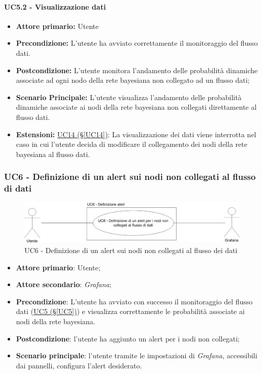\paragraph{UC5.2 - Visualizzazione dati}\label{UC5.2}
\begin{itemize}
\item \textbf{Attore primario:} Utente
\item \textbf{Precondizione:} L'utente ha avviato correttamente il monitoraggio del flusso dati.
\item \textbf{Postcondizione:} L'utente monitora l'andamento delle probabilità dinamiche associate ad ogni nodo della rete bayesiana non collegato ad un flusso dati;
\item \textbf{Scenario Principale:} L'utente visualizza l'andamento delle probabilità dinamiche associate ai nodi 			della rete bayesiana non collegati direttamente al flusso dati.
\item \textbf{Estensioni:} \hyperref[UC14]{UC14 (§\ref*{UC14})}: La visualizzazione dei dati viene interrotta nel 			caso in cui l'utente decida di modificare il collegamento dei nodi della rete bayesiana al flusso dati.
\end{itemize}

\newpage

\subsubsection{UC6 - Definizione di un alert sui nodi non collegati al flusso di dati}\label{UC6}

\begin{figure}[H]
	\centering
	\includegraphics[scale=0.3]{./images/UC6.png}
	\caption{UC6 - Definizione di un alert sui nodi non collegati al flusso dei dati}
\end{figure}

\begin{itemize}
	\item \textbf{Attore primario}: Utente;
	\item \textbf{Attore secondario}: \textit{Grafana};
	\item \textbf{Precondizione}: L'utente ha avviato con successo il monitoraggio del flusso dati (\hyperref[UC5]					{UC5 (§\ref*{UC5})}) e visualizza correttamente le probabilità associate ai nodi della rete bayesiana.
	\item \textbf{Postcondizione}: l'utente ha aggiunto un alert per i nodi non collegati;
	\item \textbf{Scenario principale}: l'utente tramite le impostazioni di \textit{Grafana}, accessibili dai pannelli, configura l'alert desiderato.
\end{itemize}

